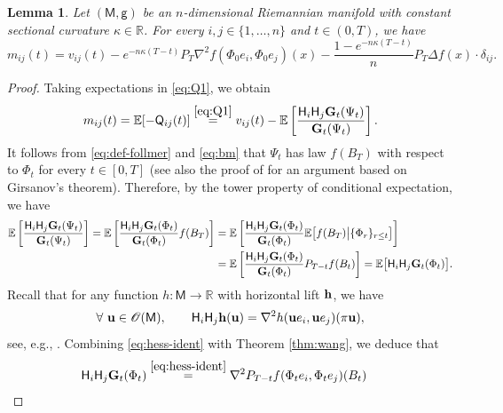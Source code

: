 \documentclass[a4paper,twoside,11pt,reqno]{amsart}
\newtheorem{lemma}[theorem]{Lemma}
\newcommand{\R}{\mathbb{R}} %
\newcommand{\li}{\bf }
\newcommand{\MM}{\mathsf{M}}
\newcommand{\GG}{\mathsf{g}}
\newcommand{\mb}{\mathbb}
\newcommand{\ms}{\mathscr}
\newcommand{\msf}{\mathsf}
\newcommand{\HH}{\mathsf{H}}
\begin{document}
\begin{lemma}
Let $(\MM,\GG)$ be an $n$-dimensional Riemannian manifold with constant sectional curvature $\kappa \in\R$. For every $i,j\in\{1,\ldots,n\}$ and $t\in(0,T)$, we have
\begin{equation} \label{eq:from-v-to-m}
m_{ij}(t) = v_{ij}(t) - e^{-n\kappa(T-t)} P_T \nabla^2 f(\Phi_0e_i, \Phi_0e_j)(x) - \frac{1-e^{-n\kappa(T-t)}}{n} P_T\Delta f(x)\cdot \delta_{ij}.
\end{equation}
\end{lemma}

\begin{proof}
Taking expectations in \eqref{eq:Q1}, we obtain
\begin{equation} \label{eq:m00}
m_{ij}(t) = \mb{E}[-\msf{Q}_{ij}(t)] \stackrel{\eqref{eq:Q1}}{=} v_{ij}(t) -\mb{E}\left[ \frac{\HH_i\HH_j {\li G}_t(\Psi_t)}{{\li G}_t(\Psi_t)}\right].
\end{equation}
It follows from \eqref{eq:def-follmer} and \eqref{eq:bm} that $\Psi_t$ has law $f(B_T)$ with respect to $\Phi_t$ for every $t\in[0,T]$ (see also the proof of \cite[Theorem~7]{Leh17} for an argument based on Girsanov's theorem). Therefore, by the tower property of conditional expectation, we have
\begin{equation} \label{eq:change-measure}
\begin{split}
\mb{E}\left[ \frac{\HH_i\HH_j {\li G}_t(\Psi_t)}{{\li G}_t(\Psi_t)}\right] = \mb{E}\left[ \frac{\HH_i\HH_j {\li G}_t(\Phi_t)}{{\li G}_t(\Phi_t)} f(B_T) \right] &= \mb{E}\left[ \frac{\HH_i\HH_j {\li G}_t(\Phi_t)}{{\li G}_t(\Phi_t)} \mb{E}\big[f(B_T)\big| \{\Phi_r\}_{r\leq t}\big] \right] 
\\ & =  \mb{E}\left[ \frac{\HH_i\HH_j {\li G}_t(\Phi_t)}{{\li G}_t(\Phi_t)} P_{T-t}f(B_t)\right] = \mb{E}\big[ \HH_i\HH_j {\li G}_t(\Phi_t) \big].
\end{split}
\end{equation}
Recall that for any function $h:\MM\to\R$ with horizontal lift ${\li h}$, we have
\begin{equation}\label{eq:hess-ident}
\forall \ {\bf u}\in\ms{O}(\MM),\qquad \HH_i\HH_j {\li h} ( {\bf u}) = \nabla^2h({\bf u}e_i, {\bf u}e_j)(\pi {\bf u}),
\end{equation}
see, e.g., \cite[Equation~(2.2.3)]{Hsu02}. Combining \eqref{eq:hess-ident} with Theorem \ref{thm:wang}, we deduce that
\begin{equation}
\begin{split}
\HH_i\HH_j & {\li G}_t (\Phi_t)  \stackrel{\eqref{eq:hess-ident}}{=} \nabla^2 P_{T-t}f (\Phi_te_i, \Phi_te_j)(B_t)

\end{split}
\end{equation}
\end{proof}
\end{document}
